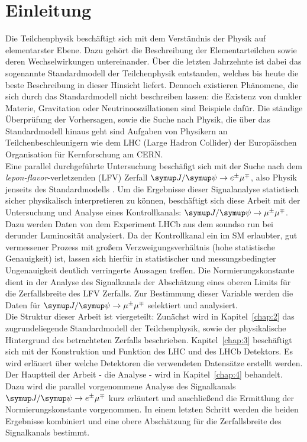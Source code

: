 \chapter{Einleitung}

Die Teilchenphysik beschäftigt sich mit dem Verständnis der Physik auf elementarster Ebene. Dazu gehört die Beschreibung der Elementarteilchen sowie deren Wechselwirkungen untereinander. Über die letzten Jahrzehnte ist dabei das sogenannte Standardmodell der Teilchenphysik entstanden, welches bis heute die beste Beschreibung in dieser Hinsicht liefert. Dennoch existieren Phänomene, die sich durch das Standardmodell nicht beschreiben lassen: die Existenz von dunkler Materie, Gravitation oder Neutrinooszillationen sind Beispiele dafür. Die ständige Überprüfung der Vorhersagen, sowie die Suche nach Physik, die über das Standardmodell hinaus geht sind Aufgaben von Physikern an Teilchenbeschleunigern wie dem LHC (Large Hadron Collider) der Europäischen Organisation für Kernforschung am CERN. \\
Eine parallel durchgeführte Untersuchung beschäfigt sich mit der Suche nach dem \textit{lepon-flavor}-verletzenden (LFV) Zerfall $\signal$, also Physik jenseits des Standardmodells \cite{ba-maik}. Um die Ergebnisse dieser Signalanalyse statistisch sicher physikalisch interpretieren zu können, beschäftigt sich diese Arbeit mit der Untersuchung und Analyse eines Kontrollkanals: $\kontroll$.
Dazu werden Daten von dem Experiment LHCb aus dem soundso run bei derunder Luminosität analysiert. Da der Kontrollkanal ein im SM erlaubter, gut vermessener Prozess mit großem Verzweigungsverhältnis (hohe statistische Genauigkeit) ist, lassen sich hierfür in statistischer und messungsbedingter Ungenauigkeit deutlich verringerte Aussagen treffen. Die Normierungskonstante dient in der Analyse des Signalkanals der Abschätzung eines oberen Limits für die Zerfallsbreite des LFV Zerfalls. Zur Bestimmung dieser Variable werden die Daten für $\kontroll$ selektiert und analysiert.\\
Die Struktur dieser Arbeit ist viergeteilt: Zunächst wird in Kapitel~\ref{chap:2} das zugrundeliegende Standardmodell der Teilchenphysik, sowie der physikalische Hintergrund des betrachteten Zerfalls beschrieben. Kapitel~\ref{chap:3} beschäftigt sich mit der Konstruktion und Funktion des LHC und des LHCb Detektors. Es wird erläuert über welche Detektoren die verwendeten Datensätze erstellt werden. Der Hauptteil der Arbeit - die Analyse - wird in Kapitel~\ref{chap:4} behandelt. Dazu wird die parallel vorgenommene Analyse des Signalkanals $\signal$ kurz erläutert und anschließend die Ermittlung der Normierungskonstante vorgenommen. In einem letzten Schritt werden die beiden Ergebnisse kombiniert und eine obere Abschätzung für die Zerfallsbreite des Signalkanals bestimmt.
